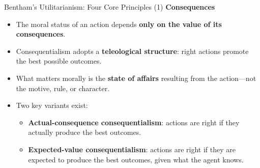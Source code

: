 \documentclass[aspectratio=169, 10pt]{beamer}
\begin{document}


\begin{frame}{Bentham’s Utilitarianism: Four Core Principles (1)}
    \textbf{Consequences}
    \begin{itemize}
        \item The moral status of an action depends \textbf{only on the value of its consequences}.
        \item Consequentialism adopts a \textbf{teleological structure}: right actions promote the best possible outcomes.
        \item What matters morally is the \textbf{state of affairs} resulting from the action—not the motive, rule, or character.
        \item Two key variants exist:
            \begin{itemize}
                \item \textbf{Actual-consequence consequentialism}: actions are right if they actually produce the best outcomes.
                \item \textbf{Expected-value consequentialism}: actions are right if they are expected to produce the best outcomes, given what the agent knows.
            \end{itemize}
    \end{itemize}
\end{frame}
\end{document}
